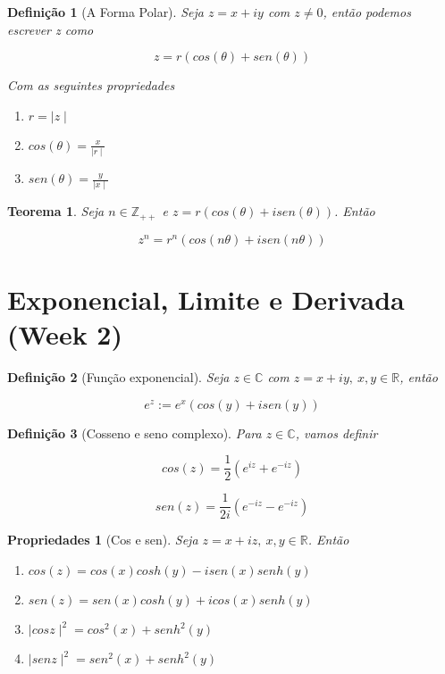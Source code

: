 \documentclass{article}
\newtheorem{prop}{Propriedades}
\newtheorem{theorem}{Teorema}
\newtheorem{definition}{Definição}
\begin{document}
\begin{definition}[A Forma Polar]
Seja $z = x + iy$ com $z \neq 0$, então podemos escrever z como

$$z = r(cos(\theta) + sen(\theta))$$

Com as seguintes propriedades

\begin{enumerate}
    \item $r = \mid z \mid $
    
    \item $cos(\theta) = \frac{x}{\mid r \mid}$
    
    \item $sen(\theta) = \frac{y}{\mid x \mid}$
\end{enumerate}
\end{definition}

\begin{theorem}
Seja $n \in \mathbb{Z}_{++}$ e $z = r(cos(\theta) + i sen(\theta))$. Então

$$z^n = r^n (cos(n\theta) + i sen(n\theta))$$
\end{theorem}

\section*{Exponencial, Limite e Derivada (Week 2)}
\label{s2}
\begin{definition}[Função exponencial]
Seja $z \in \mathbb{C}$ com $z = x + iy,\ x,y \in \mathbb{R}$, então 

$$e^z := e^x(cos(y) + i sen(y))$$
\end{definition}

\begin{definition}[Cosseno e seno complexo]
Para $z \in \mathbb{C}$, vamos definir

$$cos(z) = \frac{1}{2}(e^{iz} + e^{- iz})$$

$$sen(z) = \frac{1}{2 i}(e^{- iz} - e^{- iz})$$
\end{definition}


\begin{prop}[Cos e sen]
Seja $z = x + iz,\ x, y \in \mathbb{R}$. Então

\begin{enumerate}[label=(\alph*)]
    \item $cos(z) = cos(x) cosh(y) - i sen(x) senh(y)$
    
    \item $sen(z) = sen(x) cosh(y) + i cos(x) senh(y)$
    
    \item $\mid cos z \mid^2 = cos^2(x) + senh^2(y)$
    
    \item $\mid sen z \mid^2 = sen^2(x) + senh^2(y)$
\end{enumerate}
\end{prop}
\end{document}
